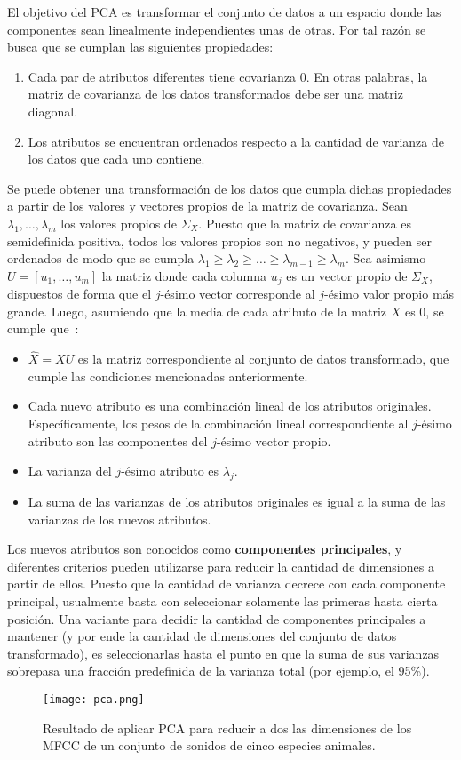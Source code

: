 El objetivo del PCA es transformar el conjunto de datos a un espacio donde las componentes sean linealmente independientes unas de otras.
Por tal razón se busca que se cumplan las siguientes propiedades:

\begin{enumerate}
    \item Cada par de atributos diferentes tiene covarianza 0.
    En otras palabras, la matriz de covarianza de los datos transformados debe ser una matriz diagonal.
    \item Los atributos se encuentran ordenados respecto a la cantidad de varianza de los datos que cada uno contiene.
\end{enumerate}

Se puede obtener una transformación de los datos que cumpla dichas propiedades a partir de los valores y vectores propios de la matriz de covarianza.
Sean $\lambda_1,\dots,\lambda_m$ los valores propios de $\Sigma_X$.
Puesto que la matriz de covarianza es semidefinida positiva, todos los valores propios son no negativos, y pueden ser ordenados de modo que se cumpla $\lambda_1 \geq \lambda_2 \geq \dots \geq \lambda_{m-1} \geq \lambda_m$.
Sea asimismo $U = [u_1,\dots,u_m]$ la matriz donde cada columna $u_j$ es un vector propio de $\Sigma_X$, dispuestos de forma que el $j$-ésimo vector corresponde al $j$-ésimo valor propio más grande.
Luego, asumiendo que la media de cada atributo de la matriz $X$ es 0, se cumple que~\cite{Smith02,Tan05}:

\begin{itemize}
    \item $\hat{X} = XU$ es la matriz correspondiente al conjunto de datos transformado, que cumple las condiciones mencionadas anteriormente.
    \item Cada nuevo atributo es una combinación lineal de los atributos originales. Específicamente, los pesos de la combinación lineal correspondiente al $j$-ésimo atributo son las componentes del $j$-ésimo vector propio.
    \item La varianza del $j$-ésimo atributo es $\lambda_j$.
    \item La suma de las varianzas de los atributos originales es igual a la suma de las varianzas de los nuevos atributos.
\end{itemize}

Los nuevos atributos son conocidos como \textbf{componentes principales}, y diferentes criterios pueden utilizarse para reducir la cantidad de dimensiones a partir de ellos.
Puesto que la cantidad de varianza decrece con cada componente principal, usualmente basta con seleccionar solamente las primeras hasta cierta posición.
Una variante para decidir la cantidad de componentes principales a mantener (y por ende la cantidad de dimensiones del conjunto de datos transformado), es seleccionarlas hasta el punto en que la suma de sus varianzas sobrepasa una fracción predefinida de la varianza total (por ejemplo, el 95\%).

\begin{figure}[!h]
    \centering
    \texttt{[image: pca.png]}
    \caption{Resultado de aplicar PCA para reducir a dos las dimensiones de los MFCC de un conjunto de sonidos de cinco especies animales.}
    \label{img:pca}
\end{figure}
